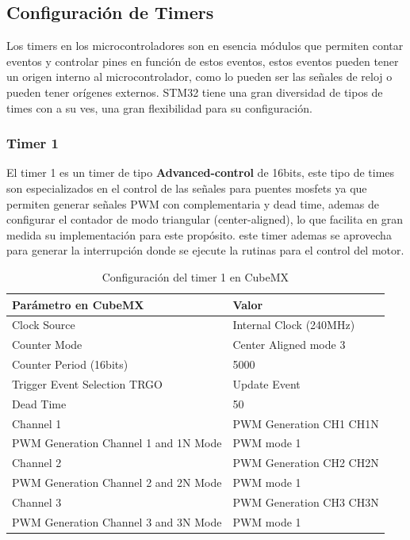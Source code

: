 \documentclass[11pt]{report}
\begin{document}
\subsection{Configuración de Timers}
Los timers en los microcontroladores son en esencia módulos que permiten contar eventos y controlar pines en función de estos eventos, estos eventos pueden tener un origen interno al microcontrolador, como lo pueden ser las señales de reloj o pueden tener orígenes externos. STM32 tiene una gran diversidad de tipos de times con a su ves, una gran flexibilidad para su configuración.

\subsubsection{Timer 1}
El timer 1 es un timer de tipo \textbf{Advanced-control} de 16bits, este tipo de times son especializados en el control de las señales para puentes mosfets ya que permiten generar señales PWM con complementaria y dead time, ademas de configurar el contador de modo triangular (center-aligned), lo que facilita en gran medida su implementación para este propósito. este timer ademas se aprovecha para generar la interrupción donde se ejecute la rutinas para el control del motor.

\begin{table}[h!]
	\centering
	\begin{tabular}{| l | l |}
		\hline
		\textbf{Parámetro en CubeMX}         & \textbf{Valor}          \\
		\hline
		Clock Source                         & Internal Clock (240MHz) \\
		Counter Mode                         & Center Aligned mode 3   \\
		Counter Period (16bits)              & 5000                    \\
		Trigger Event Selection TRGO         & Update Event            \\
		Dead Time                            & 50                      \\
		\hline
		Channel 1                            & PWM Generation CH1 CH1N \\
		PWM Generation Channel 1 and 1N Mode & PWM mode 1              \\
		\hline
		Channel 2                            & PWM Generation CH2 CH2N \\
		PWM Generation Channel 2 and 2N Mode & PWM mode 1              \\
		\hline
		Channel 3                            & PWM Generation CH3 CH3N \\
		PWM Generation Channel 3 and 3N Mode & PWM mode 1              \\
		\hline
	\end{tabular}
	\caption{Configuración del timer 1 en CubeMX}
	\label{TIM1_config}
\end{table}
\FloatBarrier
\end{document}
